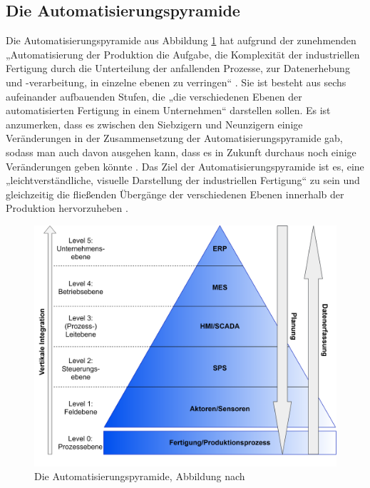 \subsection{Die Automatisierungspyramide}\label{sec:Automatisierungspyramide}
Die Automatisierungspyramide aus Abbildung \ref{fig:Automatisierungspyramide} hat aufgrund der zunehmenden „Automatisierung der Produktion die Aufgabe, die Komplexität der industriellen Fertigung durch die Unterteilung der anfallenden Prozesse, zur Datenerhebung und -verarbeitung, in einzelne ebenen zu verringen“ \cite[S.49]{14}. Sie ist besteht aus sechs aufeinander aufbauenden Stufen, die „die verschiedenen Ebenen der automatisierten Fertigung in einem Unternehmen“ \cite[S.49]{14} darstellen sollen. Es ist anzumerken, dass es zwischen den Siebzigern und Neunzigern einige Veränderungen in der Zusammensetzung der Automatisierungspyramide gab, sodass man auch davon ausgehen kann, dass es in Zukunft durchaus noch einige Veränderungen geben könnte \cite[S.49]{14}. Das Ziel der Automatisierungspyramide ist es, eine „leichtverständliche, visuelle Darstellung der industriellen Fertigung“ \cite[S.49]{14} zu sein und gleichzeitig die fließenden Übergänge der verschiedenen Ebenen innerhalb der Produktion hervorzuheben \cite[S.49]{14}.
\begin{figure}[h]
	\centering
	\includegraphics[width=1\linewidth]{Bilder/A9_Automatisierungspyramide}
	\caption{Die Automatisierungspyramide, Abbildung nach \cite[S.49]{14}}
	\label{fig:Automatisierungspyramide}
\end{figure}
\newline\newline
